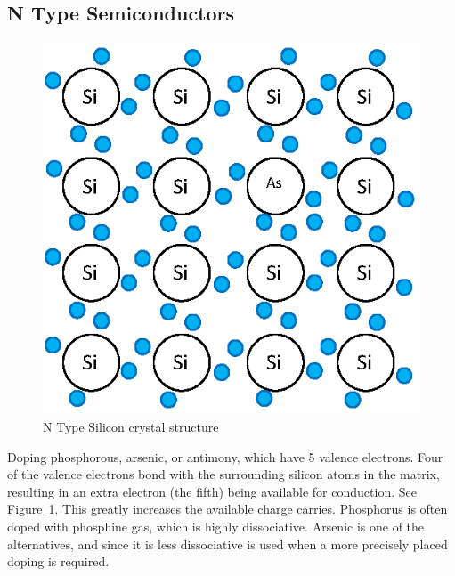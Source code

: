 \subsection{N Type Semiconductors}
\begin{figure}
\vspace*{-.4in}
\centering
\caption{N Type Silicon crystal structure}\label{f-semiconductor-n}
\includegraphics{semiconductors_n}
\end{figure}

Doping phosphorous, arsenic, or antimony, which have 5 valence electrons.  Four of the valence electrons bond with the surrounding silicon atoms in the matrix, resulting in an extra electron (the fifth) being available for conduction.  See Figure~\ref{f-semiconductor-n}.  This greatly increases the available charge carries.  Phosphorus is often doped with phosphine gas, which is highly dissociative.  Arsenic is one of the alternatives, and since it is less dissociative is used when a more precisely placed doping is required.

